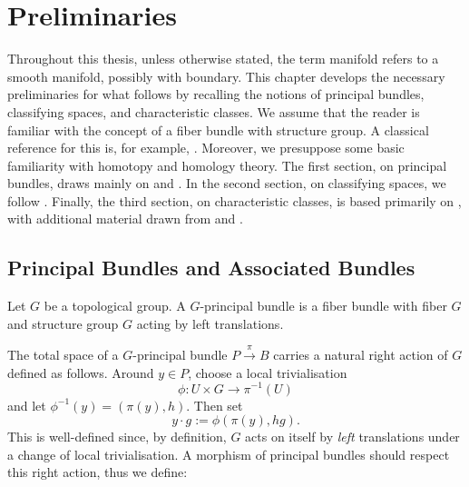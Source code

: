 \chapter{Preliminaries}
\label{chapter:preliminaries}

Throughout this thesis, unless otherwise stated, the term manifold refers to a smooth manifold, possibly with boundary. This chapter develops the necessary preliminaries for what follows by recalling the notions of principal bundles, classifying spaces, and characteristic classes. We assume that the reader is familiar with the concept of a fiber bundle with structure group. A classical reference for this is, for example, \cite{steenrod1951topology}. Moreover, we presuppose some basic familiarity with homotopy and homology theory. The first section, on principal bundles, draws mainly on \cite{davis2001lecture} and \cite{Mitchell2011PrincipalBundles}. In the second section, on classifying spaces, we follow \cite{ebert_bordism_script}. Finally, the third section, on characteristic classes, is based primarily on \cite{Hatcher2003VectorBundles}, with additional material drawn from \cite{LawsonMichelsohn1989SpinGeometry} and \cite{Frenck2026Doubling}.

\section{Principal Bundles and Associated Bundles}
\label{subsec:principal_bundles}

\begin{definition}
    \label{bundles:def:principal_bundle}
    Let $G$ be a topological group. A $G$-principal bundle is a fiber bundle with fiber $G$ and structure group $G$ acting by left translations.
\end{definition}

The total space of a $G$-principal bundle $P \xrightarrow{\pi} B$ carries a natural right action of $G$ defined as follows. Around $y \in P$, choose a local trivialisation
\[
\phi \colon U \times G \to \pi^{-1}(U)
\]
and let $\phi^{-1}(y) = (\pi(y),h)$. Then set 
\[
y \cdot g := \phi(\pi(y),hg).
\]
This is well-defined since, by definition, $G$ acts on itself by \textit{left} translations under a change of local trivialisation. 
A morphism of principal bundles should respect this right action, thus we define:

